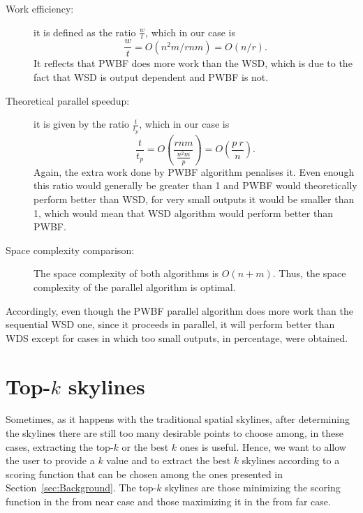\documentclass[11pt,onecolumn]{elsart3p}
\begin{document}
        \begin{description}

            \item[Work efficiency:] it is defined as the ratio $\frac{w}{t}$, which in our case is  $$\frac{w}{t} = O(n^2m/rnm) = O(n/r).$$ It reflects that PWBF does more work than the  WSD, which is due to the fact that WSD is output dependent and PWBF is not.\\

            \item[Theoretical parallel speedup:] it is given by the ratio $\frac{t}{t_p}$, which in our case is $$\frac{t}{t_p} = O\left(\frac{rnm}{\frac{n^2m}{p}}\right) = O\left(\frac{p\ r}{n}\right).$$
                Again, the extra work done by PWBF algorithm penalises it. Even enough this ratio would generally be greater than 1 and PWBF would theoretically perform better than WSD,  for very small outputs it would be smaller than 1, which would mean that WSD algorithm would perform better than PWBF.\\

            \item[Space complexity comparison:] The space complexity of both algorithms is $O(n+m)$. Thus, the space complexity of the parallel algorithm is optimal.\\

        \end{description}

        Accordingly, even though the PWBF parallel algorithm does more work than the sequential WSD one, since it proceeds in parallel, it will perform better than WDS except for cases in which too small outputs, in percentage, were obtained. %


\section{Top-$k$ skylines}\label{sec:top_k}
        Sometimes, as it happens with the traditional spatial skylines, after determining the skylines there are still too many desirable points to choose among, in these cases,  extracting the top-$k$ or the best $k$ ones is useful. Hence, we want to allow the user to provide a $k$ value and to extract the best $k$ skylines according to a scoring function that can be chosen among the ones presented in Section~\ref{sec:Background}. %
        The top-$k$ skylines are those minimizing the scoring function in the from near case and those maximizing it in the from far case.
\end{document}
